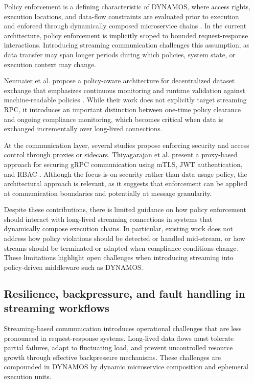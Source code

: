 Policy enforcement is a defining characteristic of DYNAMOS, where access rights, execution locations, and data-flow constraints are evaluated prior to execution and enforced through dynamically composed microservice chains \cite{stutterheim2023thesis,stutterheim2023icsa}. In the current architecture, policy enforcement is implicitly scoped to bounded request-response interactions. Introducing streaming communication challenges this assumption, as data transfer may span longer periods during which policies, system state, or execution context may change.

Neumaier et al. propose a policy-aware architecture for decentralized dataset exchange that emphasizes continuous monitoring and runtime validation against machine-readable policies \cite{neumaier2021policyaware}. While their work does not explicitly target streaming RPC, it introduces an important distinction between one-time policy clearance and ongoing compliance monitoring, which becomes critical when data is exchanged incrementally over long-lived connections.

At the communication layer, several studies propose enforcing security and access control through proxies or sidecars. Thiyagarajan et al. present a proxy-based approach for securing gRPC communication using mTLS, JWT authentication, and RBAC \cite{thiyagarajan2025grpcsecurity}. Although the focus is on security rather than data usage policy, the architectural approach is relevant, as it suggests that enforcement can be applied at communication boundaries and potentially at message granularity.

Despite these contributions, there is limited guidance on how policy enforcement should interact with long-lived streaming connections in systems that dynamically compose execution chains. In particular, existing work does not address how policy violations should be detected or handled mid-stream, or how streams should be terminated or adapted when compliance conditions change. These limitations highlight open challenges when introducing streaming into policy-driven middleware such as DYNAMOS.

\subsection{Resilience, backpressure, and fault handling in streaming workflows}

Streaming-based communication introduces operational challenges that are less pronounced in request-response systems. Long-lived data flows must tolerate partial failures, adapt to fluctuating load, and prevent uncontrolled resource growth through effective backpressure mechanisms. These challenges are compounded in DYNAMOS by dynamic microservice composition and ephemeral execution units.

